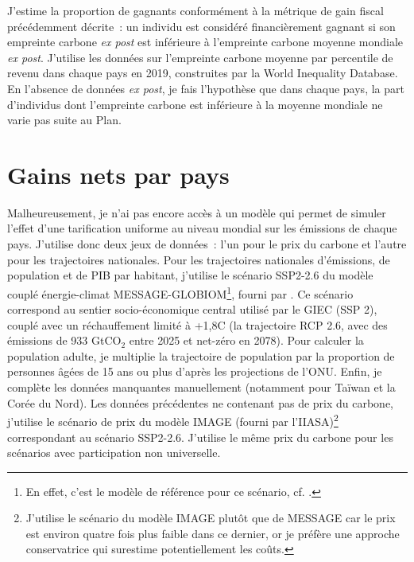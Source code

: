 \documentclass[a5paper,french,openany]{memoir}
\begin{document}
J'estime la proportion de gagnants conformément à la métrique de gain fiscal précédemment décrite~: un individu est considéré financièrement gagnant si son empreinte carbone \textit{ex post} est inférieure à l'empreinte carbone moyenne mondiale \textit{ex post}. J'utilise les données sur l'empreinte carbone moyenne par percentile de revenu dans chaque pays en 2019, construites par la World Inequality Database. En l'absence de données \textit{ex post}, je fais l'hypothèse que dans chaque pays, la part d'individus dont l'empreinte carbone est inférieure à la moyenne mondiale ne varie pas suite au Plan.

\section{Gains nets par pays}\label{app:pays} 

Malheureusement, je n'ai pas encore accès à un modèle qui permet de simuler l'effet d'une tarification uniforme au niveau mondial sur les émissions de chaque pays. J'utilise donc deux jeux de données~: l'un pour le prix du carbone et l'autre pour les trajectoires nationales. Pour les trajectoires nationales d'émissions, de population et de PIB par habitant, j'utilise le scénario SSP2-2.6 du modèle couplé énergie-climat MESSAGE-GLOBIOM\footnote{En effet, c'est le modèle de référence pour ce scénario, cf. \cite{fricko_marker_2017}.}, fourni par \cite{gutschow_country-resolved_2021}. Ce scénario correspond au sentier socio-économique central utilisé par le GIEC (SSP 2), couplé avec un réchauffement limité à +1,8\textdegree{}C (la trajectoire RCP 2.6, avec des émissions de 933 GtCO$_\text{2}$ entre 2025 et net-zéro en 2078). Pour calculer la population adulte, je multiplie la trajectoire de population par la proportion de personnes âgées de 15 ans ou plus d'après les projections de l'ONU. Enfin, je complète les données manquantes manuellement (notamment pour Taïwan et la Corée du Nord). Les données précédentes ne contenant pas de prix du carbone, j'utilise le scénario de prix du modèle IMAGE (fourni par l'IIASA)\footnote{J'utilise le scénario du modèle IMAGE plutôt que de MESSAGE car le prix est environ quatre fois plus faible dans ce dernier, or je préfère une approche conservatrice qui surestime potentiellement les coûts. 
} correspondant au scénario SSP2-2.6. J'utilise le même prix du carbone pour les scénarios avec participation non universelle. 
\end{document}
